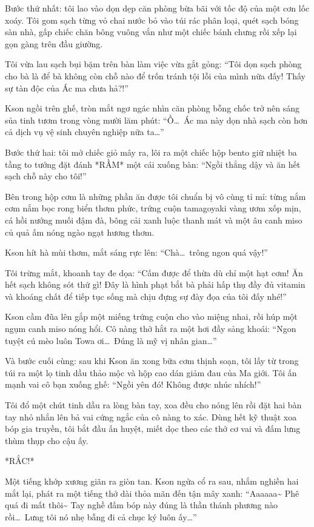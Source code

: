 \documentclass[../main.tex]{subfiles}
\begin{document}
Bước thứ nhất: tôi lao vào dọn dẹp căn phòng bừa bãi với tốc độ của một cơn lốc xoáy. Tôi gom sạch từng vỏ chai nước bỏ vào túi rác phân loại, quét sạch bóng sàn nhà, gấp chiếc chăn bông vuông vắn như một chiếc bánh chưng rồi xếp lại gọn gàng trên đầu giường.

Tôi vừa lau sạch bụi bặm trên bàn làm việc vừa gắt gỏng: ``Tôi dọn sạch phòng cho bà là để bà không còn chỗ nào để trốn tránh tội lỗi của mình nữa đấy! Thấy sự tàn độc của Ác ma chưa hả?!''

Kson ngồi trên ghế, tròn mắt ngơ ngác nhìn căn phòng bỗng chốc trở nên sáng sủa tinh tươm trong vòng mười lăm phút: ``Ồ\dots\ Ác ma này dọn nhà sạch còn hơn cả dịch vụ vệ sinh chuyên nghiệp nữa ta\dots''

Bước thứ hai: tôi mở chiếc giỏ mây ra, lôi ra một chiếc hộp bento giữ nhiệt ba tầng to tướng đặt đánh *RẦM* một cái xuống bàn: ``Ngồi thẳng dậy và ăn hết sạch chỗ này cho tôi!''

Bên trong hộp cơm là những phần ăn được tôi chuẩn bị vô cùng tỉ mỉ: từng nắm cơm nắm bọc rong biển thơm phức, trứng cuộn tamagoyaki vàng ươm xốp mịn, cá hồi nướng muối đậm đà, bông cải xanh luộc thanh mát và một âu canh miso củ quả ấm nóng ngào ngạt hương thơm.

Kson hít hà mùi thơm, mắt sáng rực lên: ``Chà\dots\ trông ngon quá vậy!''

Tôi trừng mắt, khoanh tay đe dọa: ``Cấm được để thừa dù chỉ một hạt cơm! Ăn hết sạch không sót thứ gì! Đây là hình phạt bắt bà phải hấp thụ đầy đủ vitamin và khoáng chất để tiếp tục sống mà chịu đựng sự đày đọa của tôi đấy nhé!''

Kson cầm đũa lên gắp một miếng trứng cuộn cho vào miệng nhai, rồi húp một ngụm canh miso nóng hổi. Cô nàng thở hắt ra một hơi đầy sảng khoái: ``Ngon tuyệt cú mèo luôn Towa ơi\dots\ Đúng là mỹ vị nhân gian\dots''

Và bước cuối cùng: sau khi Kson ăn xong bữa cơm thịnh soạn, tôi lấy từ trong túi ra một lọ tinh dầu thảo mộc và hộp cao dán giảm đau của Ma giới. Tôi ấn mạnh vai cô bạn xuống ghế: ``Ngồi yên đó! Không được nhúc nhích!''

Tôi đổ một chút tinh dầu ra lòng bàn tay, xoa đều cho nóng lên rồi đặt hai bàn tay nhỏ nhắn lên bả vai cứng ngắc của cô nàng to xác. Dùng hết kỹ thuật xoa bóp gia truyền, tôi bắt đầu ấn huyệt, miết dọc theo các thớ cơ vai và đấm lưng thùm thụp cho cậu ấy.

*RẮC!*

Một tiếng khớp xương giãn ra giòn tan. Kson ngửa cổ ra sau, nhắm nghiền hai mắt lại, phát ra một tiếng thở dài thỏa mãn đến tận mây xanh: ``Aaaaaa\~{} Phê quá đi mất thôi\~{} Tay nghề đấm bóp này đúng là thần thánh phương nào rồi\dots\ Lưng tôi nó nhẹ bẫng đi cả chục ký luôn ấy\dots''
\end{document}

